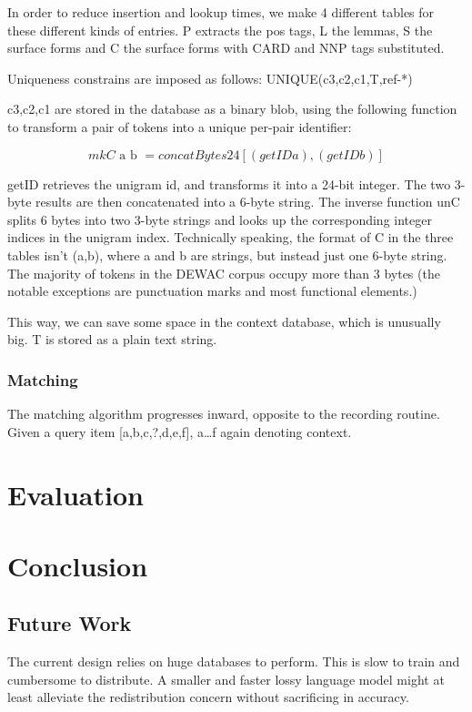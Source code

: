 \documentclass[draft,12pt]{article}
\begin{document}
   In order to reduce insertion and lookup times, we make 4 different tables
   for these different kinds of entries. P extracts the pos tags, L the lemmas,
   S the surface forms and C the surface forms with CARD and NNP tags
   substituted.

   Uniqueness constrains are imposed as follows: UNIQUE(c3,c2,c1,T,ref-*)

   c3,c2,c1 are stored in the database as a binary blob, using the following
   function to transform a pair of tokens into a unique per-pair identifier:

   \[ \mathit{mkC} \mbox{ a } \mbox{b } = \mathit{concatBytes24} [(\mathit{getID} a),(\mathit{getID} b)] \]

   getID retrieves the unigram id, and transforms it into a 24-bit integer.  The
   two 3-byte results are then concatenated into a 6-byte string. The inverse
   function unC splits 6 bytes into two 3-byte strings and looks up the
   corresponding integer indices in the unigram index. Technically speaking, the
   format of C in the three tables isn't (a,b), where a and b are strings, but
   instead just one 6-byte string. The majority of tokens in the DEWAC corpus
   occupy more than 3 bytes (the notable exceptions are punctuation marks and
   most functional elements.)

   This way, we can save some space in the context database, which is unusually
   big. T is stored as a plain text string.

\subsubsection{Matching}
   The matching algorithm progresses inward, opposite to the recording routine.
   Given a query item [a,b,c,?,d,e,f], a…f again denoting context.

\section{Evaluation}

\section{Conclusion}

\subsection{Future Work}

The current design relies on huge databases to perform. This is slow to train
and cumbersome to distribute. A smaller and faster lossy language model might at
least alleviate the redistribution concern without sacrificing in accuracy.
\end{document}
